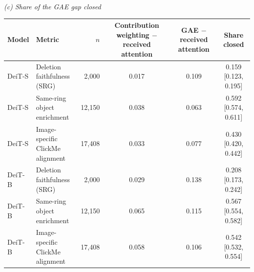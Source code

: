 \par\medskip\textit{(c) Share of the GAE gap closed}\par\smallskip
\begin{tabular}{llrccc}
\toprule
Model & Metric & $n$ & \makecell{Contribution weighting\\$-$ received attention} & \makecell{GAE $-$\\received attention} & Share closed \\
\midrule
DeiT-S & \makecell[l]{Deletion faithfulness \\ (SRG)} & 2,000 & 0.017 & 0.109 & 0.159 {\scriptsize [0.123, 0.195]} \\
\addlinespace[2pt]
DeiT-S & \makecell[l]{Same-ring object \\ enrichment} & 12,150 & 0.038 & 0.063 & 0.592 {\scriptsize [0.574, 0.611]} \\
\addlinespace[2pt]
DeiT-S & \makecell[l]{Image-specific \\ ClickMe alignment} & 17,408 & 0.033 & 0.077 & 0.430 {\scriptsize [0.420, 0.442]} \\
\addlinespace[2pt]
DeiT-B & \makecell[l]{Deletion faithfulness \\ (SRG)} & 2,000 & 0.029 & 0.138 & 0.208 {\scriptsize [0.173, 0.242]} \\
\addlinespace[2pt]
DeiT-B & \makecell[l]{Same-ring object \\ enrichment} & 12,150 & 0.065 & 0.115 & 0.567 {\scriptsize [0.554, 0.582]} \\
\addlinespace[2pt]
DeiT-B & \makecell[l]{Image-specific \\ ClickMe alignment} & 17,408 & 0.058 & 0.106 & 0.542 {\scriptsize [0.532, 0.554]} \\
\bottomrule
\end{tabular}
